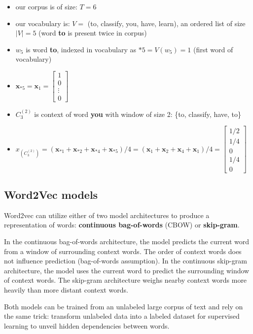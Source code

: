 \begin{itemize}
	\item our corpus is of size: $T=6$
	\item our vocabulary is: $V =$ (to, classify, you, have, learn), an ordered list of size $|V| = 5$ (word \textbf{to} is present twice in corpus)
	\item $w_5$ is word \textbf{to}, indexed in vocabulary as $*5 = V(w_5) = 1$ (first word of vocabulary)
	\item $\mathbf{x}_{*5} = \mathbf{x}_{1} = \begin{bmatrix} 
		1 \\
		0 \\
		\vdots\\
		0
	\end{bmatrix}$
	\item $C_3^{(2)}$ is context of word \textbf{you} with window of size 2: \{to, classify, have, to\}
	\item $x_{(C_3^{(2)})} = 
	(\mathbf{x}_{*1} +\mathbf{x}_{*2} + \mathbf{x}_{*4} + \mathbf{x}_{*5}) / 4 = (\mathbf{x}_{1} +\mathbf{x}_{2} + \mathbf{x}_{4} + \mathbf{x}_{1}) / 4
	=\begin{bmatrix} 
		1/2 \\
		1/4 \\
		0\\
		1/4\\
		0
	\end{bmatrix}$
\end{itemize}


\subsection{Word2Vec models}

Word2vec can utilize either of two model architectures to produce a representation of words: \textbf{continuous bag-of-words} (CBOW) or \textbf{skip-gram}. 

In the continuous bag-of-words architecture, the model predicts the current word from a window of surrounding context words. The order of context words does not influence prediction (bag-of-words assumption). In the continuous skip-gram architecture, the model uses the current word to predict the surrounding window of context words. 
The skip-gram architecture weighs nearby context words more heavily than more distant context words.

Both models can be trained from an unlabeled large corpus of text and rely on the same trick: transform unlabeled data into a labeled dataset for supervised learning to unveil hidden dependencies between words.

